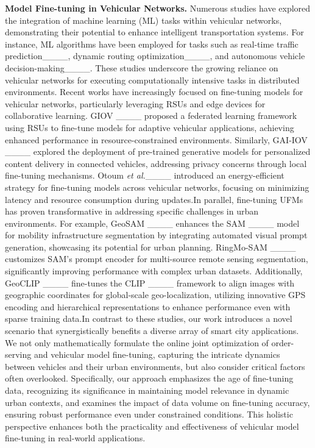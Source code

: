 \smallskip
\noindent\textbf{Model Fine-tuning in Vehicular Networks.}
Numerous studies have explored the integration of machine learning (ML) tasks within vehicular networks, demonstrating their potential to enhance intelligent transportation systems. For instance, ML algorithms have been employed for tasks such as real-time traffic prediction____, dynamic routing optimization____, and autonomous vehicle decision-making____. These studies underscore the growing reliance on vehicular networks for executing computationally intensive tasks in distributed environments. Recent works have increasingly focused on fine-tuning models for vehicular networks, particularly leveraging RSUs and edge devices for collaborative learning. GIOV ____ proposed a federated learning framework using RSUs to fine-tune models for adaptive vehicular applications, achieving enhanced performance in resource-constrained environments. Similarly, GAI-IOV ____ explored the deployment of pre-trained generative models for personalized content delivery in connected vehicles, addressing privacy concerns through local fine-tuning mechanisms. Otoum \emph{et al.}____ introduced an energy-efficient strategy for fine-tuning models across vehicular networks, focusing on minimizing latency and resource consumption during updates.In parallel, fine-tuning UFMs has proven transformative in addressing specific challenges in urban environments. For example, GeoSAM ____ enhances the SAM ____ model for mobility infrastructure segmentation by integrating automated visual prompt generation, showcasing its potential for urban planning. RingMo-SAM ____ customizes SAM’s prompt encoder for multi-source remote sensing segmentation, significantly improving performance with complex urban datasets. Additionally, GeoCLIP ____ fine-tunes the CLIP ____ framework to align images with geographic coordinates for global-scale geo-localization, utilizing innovative GPS encoding and hierarchical representations to enhance performance even with sparse training data.In contrast to these studies, our work introduces a novel scenario that synergistically benefits a diverse array of smart city applications. We not only mathematically formulate the online joint optimization of order-serving and vehicular model fine-tuning, capturing the intricate dynamics between vehicles and their urban environments, but also consider critical factors often overlooked. Specifically, our approach emphasizes the age of fine-tuning data, recognizing its significance in maintaining model relevance in dynamic urban contexts, and examines the impact of data volume on fine-tuning accuracy, ensuring robust performance even under constrained conditions. This holistic perspective enhances both the practicality and effectiveness of vehicular model fine-tuning in real-world applications.
